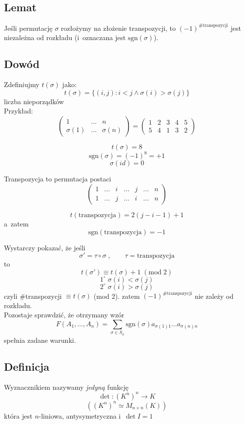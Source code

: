 \documentclass{article}
\begin{document}
  \subsection*{Lemat}
  Jeśli permutację $\sigma$ rozłożymy na złożenie transpozycji, to $(-1)^{\#\mathrm{transpozycji}}$ jest niezależna od rozkładu (i~oznaczana jest $\mathrm{sgn}(\sigma)$).

  \subsection*{Dowód}
  Zdefiniujmy $t(\sigma)$ jako:
  \[t(\sigma)=\{(i,j): i<j \land \sigma(i)>\sigma(j)\}\]
  liczba nieporządków\\
  Przykład:
  \[\begin{pmatrix}1&...&n\\\sigma(1)&...&\sigma(n)\end{pmatrix}
    =\begin{pmatrix}1&2&3&4&5\\5&4&1&3&2\end{pmatrix}\]

  \[t(\sigma) = 8\]
  \[\mathrm{sgn}(\sigma) = (-1)^8 = +1\]
  \[\sigma(id) = 0\]

  Transpozycja to permutacja postaci
  \[\begin{pmatrix}
    1&...&i&...&j&...&n\\
    1&...&j&...&i&...&n
  \end{pmatrix}\]

  \[t(\mathrm{transpozycja})=2(j-i-1)+1\]
  a~zatem
  \[\mathrm{sgn}(\mathrm{transpozycja})=-1\]

  Wystarczy pokazać, że jeśli
  \[\sigma' = \tau \circ \sigma\;,\qquad \tau=\mathrm{transpozycja}\]
  to
  \[t(\sigma') \equiv t(\sigma)+1 \;(\mathrm{mod}\; 2)\]
  \[1^\circ\; \sigma(i) < \sigma(j)\]
  \[2^\circ\; \sigma(i) > \sigma(j)\]
  czyli \#transpozycji $\equiv t(\sigma)$ (mod 2).
  zatem $(-1)^{\#\mathrm{transpozycji}}$ nie zależy od rozkładu.\\
  Pozostaje sprawdzić, że otrzymany wzór
  \[F(A_1, ..., A_n)=\sum_{\sigma \in S_n}\mathrm{sgn}(\sigma)a_{\sigma(1)1}...a_{\sigma(n)n}\]
  spełnia zadane warunki.

  \subsection*{Definicja}
  Wyznacznikiem nazywamy \textit{jedyną} funkcję
  \[\det: (K^n)^n \rightarrow K\]
  \[\left((K^n)^n \simeq M_{n \times n}(K)\right)\]
  która jest $n$-liniowa, antysymetryczna i~$\det I=1$
\end{document}
